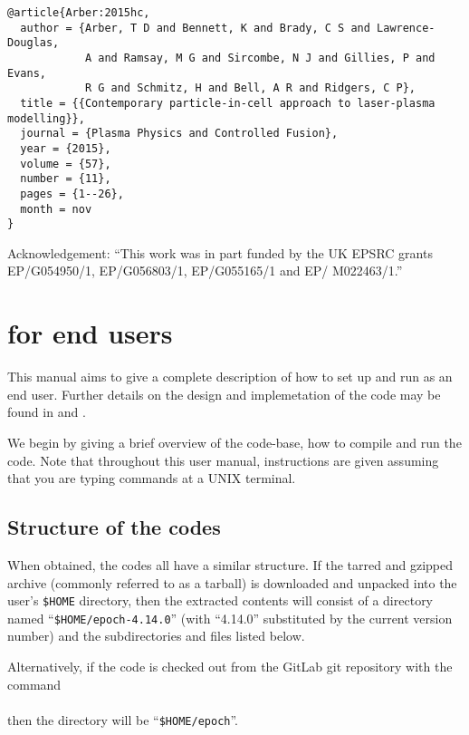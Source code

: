 \begin{verbatim}
@article{Arber:2015hc,
  author = {Arber, T D and Bennett, K and Brady, C S and Lawrence-Douglas,
            A and Ramsay, M G and Sircombe, N J and Gillies, P and Evans,
            R G and Schmitz, H and Bell, A R and Ridgers, C P},
  title = {{Contemporary particle-in-cell approach to laser-plasma modelling}},
  journal = {Plasma Physics and Controlled Fusion},
  year = {2015},
  volume = {57},
  number = {11},
  pages = {1--26},
  month = nov
}
\end{verbatim}

Acknowledgement: ``This work was in part funded by the UK EPSRC grants
EP/G054950/1, EP/G056803/1, EP/G055165/1 and EP/ M022463/1.''

\newpage
\section{{\EPOCH} for end users}
\label{sec:endusers}
This manual aims to give a complete description of how to set up and run
{\EPOCH} as an end user. Further details on the design and implemetation of
the code may be found in \citet{Arber} and \citet{Ridgers}.

We begin by giving a brief overview of the {\EPOCH} code-base, how to
compile and run the code. Note that throughout this user manual, instructions
are given assuming that you are typing commands at a UNIX terminal.

\subsection{Structure of the {\EPOCH} codes}
\label{sec:directory_structure}
When obtained, the {\EPOCH} codes all have a similar structure. If the tarred
and gzipped archive (commonly referred to as a tarball) is downloaded and
unpacked into the user's \verb|$HOME| directory, then the extracted contents
will consist of a directory named ``\verb|$HOME/epoch-4.14.0|''
(with ``4.14.0'' substituted by the current version number) and the
subdirectories and files listed below.

Alternatively, if the code is checked out from the GitLab git
repository with the command\\
\indent{}\\
\noindent%
then the directory will be ``\verb|$HOME/epoch|''.

